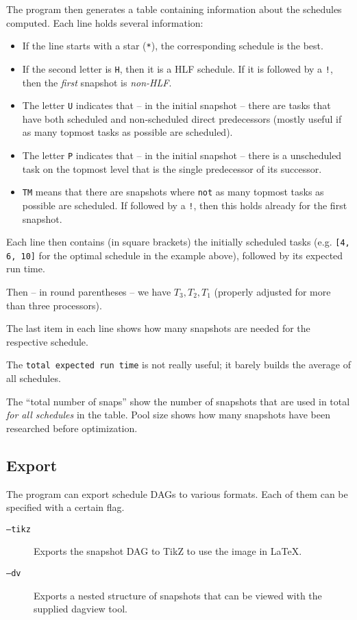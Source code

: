 \documentclass[usletter]{article}
\begin{document}
The program then generates a table containing information about the schedules computed. Each line holds several information:

\begin{itemize}
\item If the line starts with a star (\texttt{*}), the corresponding schedule is the best.
\item If the second letter is \texttt{H}, then it is a HLF schedule. If it is followed by a \texttt{!}, then the \emph{first} snapshot is \emph{non-HLF}.
\item The letter \texttt{U} indicates that -- in the initial snapshot -- there are tasks that have both scheduled and non-scheduled direct predecessors (mostly useful if as many topmost tasks as possible are scheduled).
\item The letter \texttt{P} indicates that -- in the initial snapshot -- there is a unscheduled task on the topmost level that is the single predecessor of its successor.
\item \texttt{TM} means that there are snapshots where \texttt{not} as many topmost tasks as possible are scheduled. If followed by a \texttt{!}, then this holds already for the first snapshot.
\end{itemize}

Each line then contains (in square brackets) the initially scheduled tasks (e.g. \texttt{[4, 6, 10]} for the optimal schedule in the example above), followed by its expected run time.

Then -- in round parentheses -- we have $T_3, T_2, T_1$ (properly adjusted for more than three processors).

The last item in each line shows how many snapshots are needed for the respective schedule.

The \texttt{total expected run time} is not really useful; it barely builds the average of all schedules.

The ``total number of snaps'' show the number of snapshots that are used in total \emph{for all schedules} in the table. Pool size shows how many snapshots have been researched before optimization.

\subsection{Export}

The program can export schedule DAGs to various formats. Each of them can be specified with a certain flag.

\begin{description}
\item[\texttt{--tikz}] Exports the snapshot DAG to TikZ to use the image in \LaTeX.
\item[\texttt{--dv}] Exports a nested structure of snapshots that can be viewed with the supplied dagview tool.
\end{description}
\end{document}
